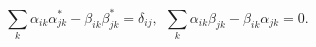 \begin{equation} \label{b conditions}
\sum_k \alpha_{ik} \alpha_{jk} ^* - \beta_{ik} \beta_{jk} ^* = \delta_{ij} , \ \ \sum_k \alpha_{ik} \beta _{jk} - \beta_{ik} \alpha_{jk} =0.
\end{equation}

